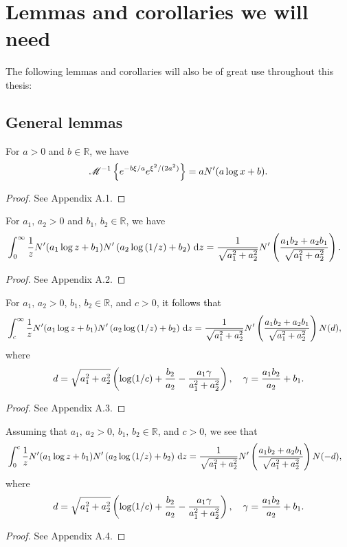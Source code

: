 \section{Lemmas and corollaries we will need}
The following lemmas and corollaries will also be of great use throughout this thesis:
\subsection{General lemmas}
	\begin{lemma}
		\label{lem:2}
	For $a > 0$ and $b \in \mathbb{R}$, we have
	\begin{equation*}
		\mathscr M^{-1}\left\{ e^{-b\xi/a}e^{\xi^2/(2a^2)} \right\} = aN'(a\log x + b).
	\end{equation*}
	\end{lemma}
\begin{proof}
	See Appendix A.1.
\end{proof}
	\begin{lemma}
		\label{lem:1}
		For $a_1, \, a_2 > 0$ and $b_1, \, b_2 \in \mathbb{R}$, we have
			\begin{align*}
				&\int_0^\infty \frac{1}{z}N'(a_1\log z + b_1)N'\left(a_2\log\left( 1/z \right) + b_2 \right) \, \mathrm d z =  \frac{1}{\sqrt{a_1^2 + a_2^2}}N'\left( \frac{a_1b_2 + a_2b_1}{\sqrt{a_1^2+a_2^2}} \right).
			\end{align*}
	\end{lemma}
	\begin{proof}
		See Appendix A.2.
	\end{proof}
	\begin{lemma}
		\label{lem:2b}
		For $a_1, \, a_2 > 0$, $b_1, \, b_2 \in \mathbb{R}$, and $c > 0$, \textcolor{black}{it follows that}
		\begin{align*}
			&\int_c^\infty \frac{1}{z}N'(a_1\log z + b_1)N'\left(a_2\log\left( 1/z \right) + b_2 \right) \, \mathrm d z =  \frac{1}{\sqrt{a_1^2 + a_2^2}}N'\left( \frac{a_1b_2 + a_2b_1}{\sqrt{a_1^2+a_2^2}} \right)N(d),
		\end{align*}
		where
		$$
			d = \sqrt{a_1^2+a_2^2}\left( \log(1/c) + \frac{b_2}{a_2} - \frac{a_1\gamma}{a_1^2+a_2^2} \right), \quad
			\gamma = \frac{a_1b_2}{a_2} + b_1.
		$$
	\end{lemma}
	\begin{proof}
		See Appendix A.3.
	\end{proof}
	
	\begin{lemma}
		\label{lem:2bb}
		Assuming that $a_1, \, a_2 > 0$, $b_1, \, b_2 \in \mathbb{R}$, and $c > 0$, we see that
		\begin{align*}
			&\int_0^c \frac{1}{z}N'(a_1\log z + b_1)N'\left(a_2\log\left( 1/z \right) + b_2 \right) \, \mathrm d z =  \frac{1}{\sqrt{a_1^2 + a_2^2}}N'\left( \frac{a_1b_2 + a_2b_1}{\sqrt{a_1^2+a_2^2}} \right)N(-d),
		\end{align*}
		where
		$$
			d = \sqrt{a_1^2+a_2^2}\left( \log(1/c) + \frac{b_2}{a_2} - \frac{a_1\gamma}{a_1^2+a_2^2} \right), \quad
			\gamma = \frac{a_1b_2}{a_2} + b_1.
		$$
	\end{lemma}
	\begin{proof}
		See Appendix A.4.
	\end{proof}


